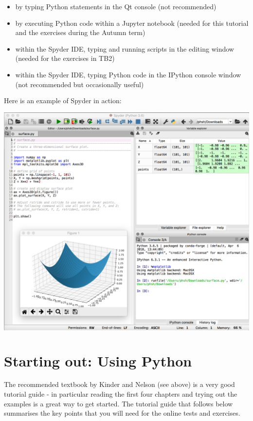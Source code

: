 \documentclass[10pt]{article}
\providecommand{\tightlist}{%
      \setlength{\itemsep}{0pt}\setlength{\parskip}{0pt}}
\begin{document}
\begin{itemize}
\tightlist
\item
  by typing Python statements in the Qt console (not recommended)
\item
  by executing Python code within a Jupyter notebook (needed for this
  tutorial and the exercises during the Autumn term)
\item
  within the Spyder IDE, typing and running scripts in the editing
  window (needed for the exercises in TB2)
\item
  within the Spyder IDE, typing Python code in the IPython console
  window (not recommended but occasionally useful)
\end{itemize}

Here is an example of Spyder in action: 

\includegraphics[width=0.9\linewidth]{Spyder.png}


    \hypertarget{starting-out-using-python}{%
\section{Starting out: Using Python}\label{starting-out-using-python}}

The recommended textbook by Kinder and Nelson (see above) is a very good
tutorial guide - in particular reading the first four chapters and
trying out the examples is a great way to get started. The tutorial
guide that follows below summarises the key points that you will need
for the online tests and exercises. 
\end{document}
